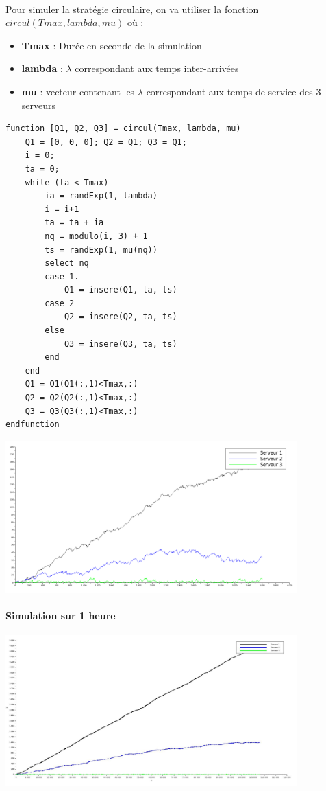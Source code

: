 \documentclass{article}
\begin{document}
\paragraph{}
Pour simuler la stratégie circulaire, on va utiliser la fonction $circul(Tmax,lambda,mu)$ où :
\begin{itemize}
	\item \textbf{Tmax} : Durée en seconde de la simulation
	\item \textbf{lambda} : $\lambda$ correspondant aux temps inter-arrivées
	\item \textbf{mu} : vecteur contenant les $\lambda$ correspondant aux temps de service des 3 serveurs
\end{itemize}
\begin{verbatim}
function [Q1, Q2, Q3] = circul(Tmax, lambda, mu)
	Q1 = [0, 0, 0]; Q2 = Q1; Q3 = Q1;
	i = 0; 
	ta = 0; 
	while (ta < Tmax)
		ia = randExp(1, lambda) 
		i = i+1 
		ta = ta + ia
		nq = modulo(i, 3) + 1
		ts = randExp(1, mu(nq))
		select nq 
		case 1.
			Q1 = insere(Q1, ta, ts)
		case 2 
			Q2 = insere(Q2, ta, ts)
		else
			Q3 = insere(Q3, ta, ts)
		end
	end
	Q1 = Q1(Q1(:,1)<Tmax,:)
	Q2 = Q2(Q2(:,1)<Tmax,:) 
	Q3 = Q3(Q3(:,1)<Tmax,:) 
endfunction 
\end{verbatim}

\begin{center}
	\includegraphics[width=425px]{img/circul1h.png}
\end{center}
\paragraph{Simulation sur 1 heure}

\begin{center}
	\includegraphics[width=425px]{img/circul30h.jpg}
\end{center}
\end{document}
